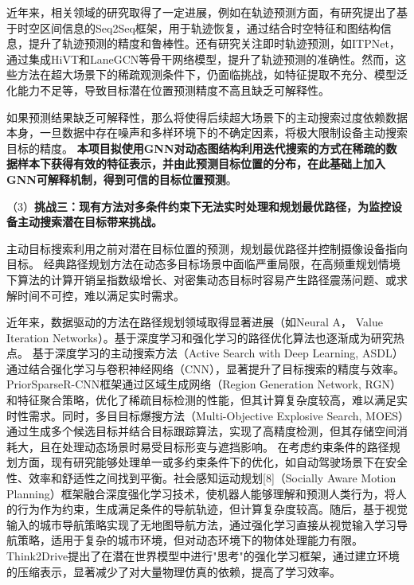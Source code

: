 近年来，相关领域的研究取得了一定进展，例如在轨迹预测方面，有研究提出了基于时空区间信息的Seq2Seq\cite{Seq2SeqTrajRec}框架，用于轨迹恢复，通过结合时空特征和图结构信息，提升了轨迹预测的精度和鲁棒性。还有研究关注即时轨迹预测，如ITPNet\cite{ITPNet}，通过集成HiVT\cite{zhou2022hivt}和LaneGCN\cite{liang2020learning}等骨干网络模型，提升了轨迹预测的准确性。然而，这些方法在超大场景下的稀疏观测条件下，仍面临挑战，如特征提取不充分、模型泛化能力不足等，导致目标潜在位置预测精度不高且缺乏可解释性。

如果预测结果缺乏可解释性，那么将使得后续超大场景下的主动搜索过度依赖数据本身，一旦数据中存在噪声和多样环境下的不确定因素，将极大限制设备主动搜索目标的精度。
\textbf{本项目拟使用GNN对动态图结构利用迭代搜索的方式在稀疏的数据样本下获得有效的特征表示，并由此预测目标位置的分布，在此基础上加入GNN可解释机制，得到可信的目标位置预测}。


（3）\textbf{挑战三：现有方法对多条件约束下无法实时处理和规划最优路径，为监控设备主动搜索潜在目标带来挑战。}

主动目标搜索利用之前对潜在目标位置的预测，规划最优路径并控制摄像设备指向目标。
经典路径规划方法在动态多目标场景中面临严重局限，在高频重规划情境下算法的计算开销呈指数级增长\cite{bhardwaj2017learningheuristicsearchimitation}、对密集动态目标时容易产生路径震荡问题\cite{9154607}、或求解时间不可控\cite{10.1145/3272127.3275109}，难以满足实时需求。

近年来，数据驱动的方法在路径规划领域取得显著进展（如Neural A\cite{Archetti_2022}， Value Iteration Networks\cite{tamar2017valueiterationnetworks}）。基于深度学习和强化学习的路径优化算法也逐渐成为研究热点\cite{zheng2023distributed,cui2024multi,fang2024improved}。
基于深度学习的主动搜索方法\cite{DBLP:conf/iclr/HottungKT22}（Active Search with Deep Learning, ASDL）通过结合强化学习与卷积神经网络（CNN），显著提升了目标搜索的精度与效率。
PriorSparseR-CNN框架\cite{wang2024priorsparse}通过区域生成网络（Region Generation Network, RGN）和特征聚合策略，优化了稀疏目标检测的性能，但其计算复杂度较高，难以满足实时性需求。同时，多目目标爆搜方法（Multi-Objective Explosive Search, MOES）\cite{moes2024}通过生成多个候选目标并结合目标跟踪算法，实现了高精度检测，但其存储空间消耗大，且在处理动态场景时易受目标形变与遮挡影响。
在考虑约束条件的路径规划方面，现有研究能够处理单一或多约束条件下的优化，如自动驾驶场景下在安全性、效率和舒适性之间找到平衡\cite{yang2019generalizedalgorithmmultiobjectivereinforcement}。社会感知运动规划[8]（Socially Aware Motion Planning）框架融合深度强化学习技术，使机器人能够理解和预测人类行为，将人的行为作为约束，生成满足条件的导航轨迹，但计算复杂度较高。随后，基于视觉输入的城市导航策略\cite{mirowski2019learningnavigatecitiesmap}实现了无地图导航方法，通过强化学习直接从视觉输入学习导航策略，适用于复杂的城市环境，但对动态环境下的物体处理能力有限。
Think2Drive\cite{li2024think2driveefficientreinforcementlearning}提出了在潜在世界模型中进行"思考"的强化学习框架，通过建立环境的压缩表示，显著减少了对大量物理仿真的依赖，提高了学习效率。

